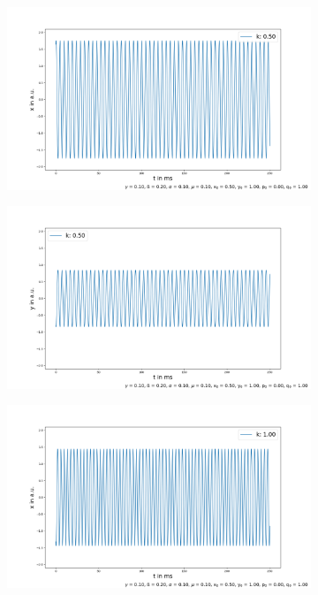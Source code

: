 \documentclass[oneside,10pt,a4paper]{report}
\begin{document}
\begin{figure}[H]
\begin{subfigure}[b]{0.45\textwidth}
				\caption{}
				\label{fig: y2}
			\end{subfigure}
			\begin{subfigure}[b]{0.45\textwidth}
				\includegraphics[width=\textwidth]{x_k3.png}
				\caption{}
				\label{fig:x3}
			\end{subfigure}
			\hfill
			\begin{subfigure}[b]{0.45\textwidth}
				\includegraphics[width=\textwidth]{y_k3.png}
				\caption{}
				\label{fig: y3}
			\end{subfigure}
			\begin{subfigure}[b]{0.45\textwidth}
				\includegraphics[width=\textwidth]{x_k4.png}

\end{subfigure}
\end{figure}
\end{document}
